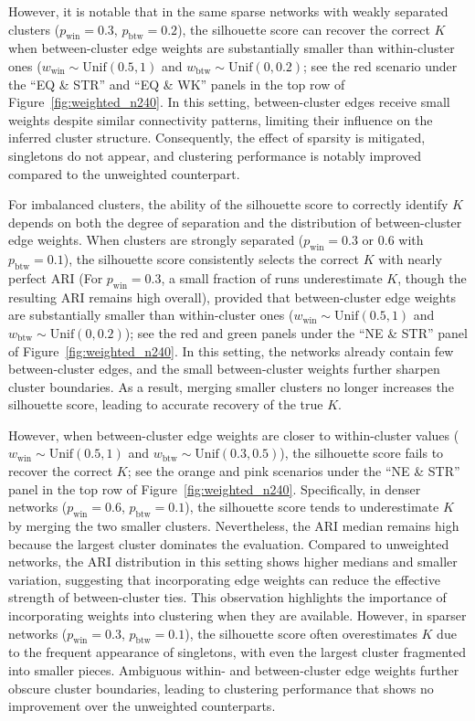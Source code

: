\documentclass[12pt, titlepage, reqno]{article}
\begin{document}
However, it is notable that in the same sparse networks with weakly 
separated clusters ($p_\text{win} = 0.3$, $p_\text{btw} = 0.2$), the 
silhouette score can recover the correct $K$ when between-cluster 
edge weights are substantially smaller than within-cluster ones 
($w_\text{win} \sim \text{Unif}(0.5,1)$ and $w_\text{btw} \sim 
\text{Unif}(0,0.2)$; see the red scenario under the ``EQ \& STR'' and 
``EQ \& WK'' panels in the top row of 
Figure~\ref{fig:weighted_n240}. In this setting, between-cluster 
edges receive small weights despite similar connectivity patterns, 
limiting their influence on the inferred cluster structure. 
Consequently, the effect of sparsity is mitigated, 
singletons do not appear, and clustering performance is notably 
improved compared to the unweighted counterpart.


For imbalanced clusters, the ability of the silhouette score to 
correctly identify $K$ depends on both the degree of separation and 
the distribution of between-cluster edge weights. When clusters are 
strongly separated ($p_\text{win} = 0.3$ or $0.6$ with 
$p_\text{btw} = 0.1$), the silhouette score consistently selects the 
correct $K$ with nearly perfect ARI (For $p_\text{win} = 0.3$, a 
small fraction of runs underestimate $K$, though the resulting ARI 
remains high overall), provided that between-cluster edge weights are 
substantially smaller 
than within-cluster ones ($w_\text{win} \sim \text{Unif}(0.5, 1)$ and 
$w_\text{btw} \sim \text{Unif}(0, 0.2)$); see the red and green 
panels under the ``NE \& STR'' panel of 
Figure~\ref{fig:weighted_n240}. In this setting, the 
networks already contain few between-cluster edges, and the small 
between-cluster weights further sharpen cluster boundaries. As a 
result, merging smaller clusters no longer increases the silhouette 
score, leading to accurate recovery of the true $K$. 


However, when between-cluster edge weights are closer to 
within-cluster values ($w_\text{win} \sim \text{Unif}(0.5,1)$ and 
$w_\text{btw} \sim \text{Unif}(0.3,0.5)$), the silhouette score fails 
to recover the correct $K$; see the orange and pink scenarios under 
the ``NE \& STR'' panel in the top row of 
Figure~\ref{fig:weighted_n240}. Specifically, in denser 
networks ($p_\text{win} = 0.6$, $p_\text{btw} = 0.1$), the silhouette 
score tends to underestimate $K$ by merging the two smaller clusters. 
Nevertheless, the ARI median remains high because the largest cluster 
dominates the evaluation. Compared to unweighted networks, the ARI 
distribution in this setting shows higher medians and smaller 
variation, suggesting that incorporating edge weights can reduce the 
effective strength of between-cluster ties. This observation 
highlights the importance of incorporating weights into clustering 
when they are available. However, in sparser networks ($p_\text{win} 
= 0.3$, $p_\text{btw} = 0.1$), the silhouette score often 
overestimates $K$ due to the frequent appearance of singletons, with 
even the largest cluster fragmented into smaller pieces. Ambiguous 
within- and between-cluster edge weights further obscure cluster 
boundaries, leading to clustering performance that shows no 
improvement over the unweighted counterparts.
\end{document}
